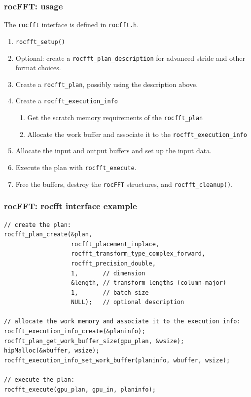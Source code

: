 \documentclass[10pt,aspectratio=169]{beamer}
\begin{document}
\begin{frame}
    \frametitle{rocFFT: usage}

    \begin{center}
      The \texttt{rocfft} interface is defined in \texttt{rocfft.h}.
    \end{center}
    
    \begin{enumerate}
    \item \lstinline[]$rocfft_setup()$
    \item Optional: create a \lstinline[]$rocfft_plan_description$ for advanced stride and
      other format choices.
    \item Create a \lstinline[]$rocfft_plan$, possibly using the description above.
    \item Create a \lstinline[]$rocfft_execution_info$
      \begin{enumerate}
      \item Get the scratch memory requirements of the \lstinline[]$rocfft_plan$
      \item Allocate the work buffer and associate it to the \lstinline[]$rocfft_execution_info$
      \end{enumerate}
    \item Allocate the input and output buffers and set up the input data.
    \item Execute the plan with \lstinline[]$rocfft_execute$.
    \item Free the buffers, destroy the \texttt{rocFFT} structures, and
      \lstinline[]$rocfft_cleanup()$.
    \end{enumerate}
    

\end{frame}

\begin{frame}[fragile]
    \frametitle{rocFFT: rocfft interface example}

\begin{lstlisting}
// create the plan:      
rocfft_plan_create(&plan,    
                   rocfft_placement_inplace,
                   rocfft_transform_type_complex_forward,
                   rocfft_precision_double,
                   1,       // dimension
                   &length, // transform lengths (column-major)
                   1,       // batch size
                   NULL);   // optional description

// allocate the work memory and associate it to the execution info:                 
rocfft_execution_info_create(&planinfo);
rocfft_plan_get_work_buffer_size(gpu_plan, &wsize);
hipMalloc(&wbuffer, wsize);
rocfft_execution_info_set_work_buffer(planinfo, wbuffer, wsize);

// execute the plan:
rocfft_execute(gpu_plan, gpu_in, planinfo);
\end{lstlisting}
\end{frame}
    
\end{document}
